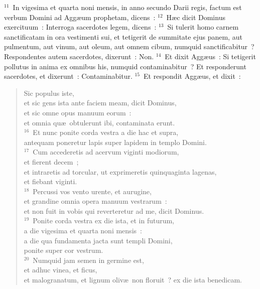${}^{11}$~In vigesima et quarta noni mensis, in anno secundo Darii regis, factum est verbum Domini ad Agg\ae um prophetam, dicens~:
${}^{12}$~H\ae c dicit Dominus exercituum~: Interroga sacerdotes legem, dicens~:
${}^{13}$~Si tulerit homo carnem sanctificatam in ora vestimenti sui, et tetigerit de summitate ejus panem, aut pulmentum, aut vinum, aut oleum, aut omnem cibum, numquid sanctificabitur~? Respondentes autem sacerdotes, dixerunt~: Non.
${}^{14}$~Et dixit Agg\ae us~: Si tetigerit pollutus in anima ex omnibus his, numquid contaminabitur~? Et responderunt sacerdotes, et dixerunt~: Contaminabitur.
${}^{15}$~Et respondit Agg\ae us, et dixit~: \begin{verse}Sic populus iste,\\ et sic gens ista ante faciem meam, dicit Dominus,\\ et sic omne opus manuum eorum~:\\ et omnia qu\ae\ obtulerunt ibi, contaminata erunt.\\
${}^{16}$~Et nunc ponite corda vestra a die hac et supra,\\ antequam poneretur lapis super lapidem in templo Domini.\\
${}^{17}$~Cum accederetis ad acervum viginti modiorum,\\ et fierent decem~;\\ et intraretis ad torcular, ut exprimeretis quinquaginta lagenas,\\ et fiebant viginti.\\
${}^{18}$~Percussi vos vento urente, et aurugine,\\ et grandine omnia opera manuum vestrarum~:\\ et non fuit in vobis qui reverteretur ad me, dicit Dominus.\\
${}^{19}$~Ponite corda vestra ex die ista, et in futurum,\\ a die vigesima et quarta noni mensis~:\\ a die qua fundamenta jacta sunt templi Domini,\\ ponite super cor vestrum.\\
${}^{20}$~Numquid jam semen in germine est,\\ et adhuc vinea, et ficus,\\ et malogranatum, et lignum oliv\ae\ non floruit~? ex die ista benedicam.\end{verse}


